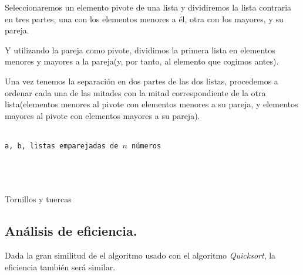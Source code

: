 \documentclass[a4paper, 11pt]{article} %
\begin{document}
    Seleccionaremos un elemento pivote de una lista y dividiremos la lista contraria en tres partes, una con los elementos menores a él, otra con los mayores, y su pareja.
    
    Y utilizando la pareja como pivote, dividimos la primera lista en elementos menores y mayores a la pareja(y, por tanto, al elemento que cogimos antes).
    
    Una vez tenemos la separación en dos partes de las dos listas, procedemos a ordenar cada una de las mitades con la mitad 
    correspondiente de la otra lista(elementos menores al pivote con elementos menores a su pareja, y elementos mayores al pivote con elementos mayores a su pareja).
\begin{algorithm}[H]
	\begin{algorithmic}[1]
	  \REQUIRE \ \\
	    \texttt{a, b, listas emparejadas de $n$ números}\\
	    \RETURN {\texttt{[]}}
	  \ELSE
	    \\
	  
	  \ENDIF \\\
	\end{algorithmic}
    \caption{Tornillos y tuercas}
    \label{TyT}
\end{algorithm}
  \subsection{Análisis de eficiencia.}
      Dada la gran similitud de el algoritmo usado con el algoritmo \textit{Quicksort}, la eficiencia también será similar.
      
\end{document}

